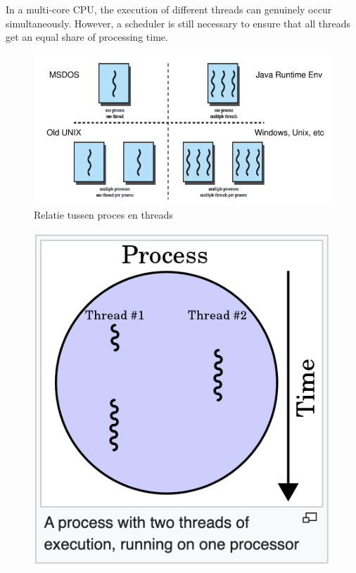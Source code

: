 In a multi-core CPU, the execution of different threads can genuinely occur simultaneously. However, a scheduler is still necessary to ensure that all threads get an equal share of processing time.

\begin{figure}[H]
  \includegraphics[width=\linewidth]{images/h9/process_threads.png} 
  \caption{Relatie tussen proces en threads}
  \label{fig:proces_thread}
\end{figure}

\begin{figure}[H]
  \includegraphics[scale=1]{images/h9/process_with_two_threads.png}
  \label{fig:proces_thread_2}
\end{figure}

